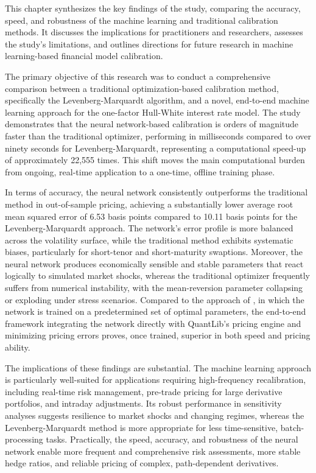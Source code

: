 This chapter synthesizes the key findings of the study, comparing the accuracy, speed, and robustness of the machine learning and traditional calibration methods. It discusses the implications for practitioners and researchers, assesses the study's limitations, and outlines directions for future research in machine learning-based financial model calibration.

The primary objective of this research was to conduct a comprehensive comparison between a traditional optimization-based calibration method, specifically the Levenberg-Marquardt algorithm, and a novel, end-to-end machine learning approach for the one-factor Hull-White interest rate model. The study demonstrates that the neural network-based calibration is orders of magnitude faster than the traditional optimizer, performing in milliseconds compared to over ninety seconds for Levenberg-Marquardt, representing a computational speed-up of approximately 22,555 times. This shift moves the main computational burden from ongoing, real-time application to a one-time, offline training phase.  

In terms of accuracy, the neural network consistently outperforms the traditional method in out-of-sample pricing, achieving a substantially lower average root mean squared error of 6.53 basis points compared to 10.11 basis points for the Levenberg-Marquardt approach. The network's error profile is more balanced across the volatility surface, while the traditional method exhibits systematic biases, particularly for short-tenor and short-maturity swaptions. Moreover, the neural network produces economically sensible and stable parameters that react logically to simulated market shocks, whereas the traditional optimizer frequently suffers from numerical instability, with the mean-reversion parameter collapsing or exploding under stress scenarios. Compared to the approach of \textcite{hernandez2016model}, in which the network is trained on a predetermined set of optimal parameters, the end-to-end framework integrating the network directly with QuantLib’s pricing engine and minimizing pricing errors proves, once trained, superior in both speed and pricing ability.  

The implications of these findings are substantial. The machine learning approach is particularly well-suited for applications requiring high-frequency recalibration, including real-time risk management, pre-trade pricing for large derivative portfolios, and intraday adjustments. Its robust performance in sensitivity analyses suggests resilience to market shocks and changing regimes, whereas the Levenberg-Marquardt method is more appropriate for less time-sensitive, batch-processing tasks. Practically, the speed, accuracy, and robustness of the neural network enable more frequent and comprehensive risk assessments, more stable hedge ratios, and reliable pricing of complex, path-dependent derivatives.  

